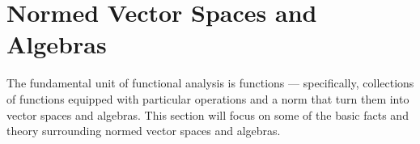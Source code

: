 \section{Normed Vector Spaces and Algebras}%
The fundamental unit of functional analysis is functions --- specifically, collections of functions equipped with particular operations and a norm that turn them into vector spaces and algebras. This section will focus on some of the basic facts and theory surrounding normed vector spaces and algebras.\newline
%
